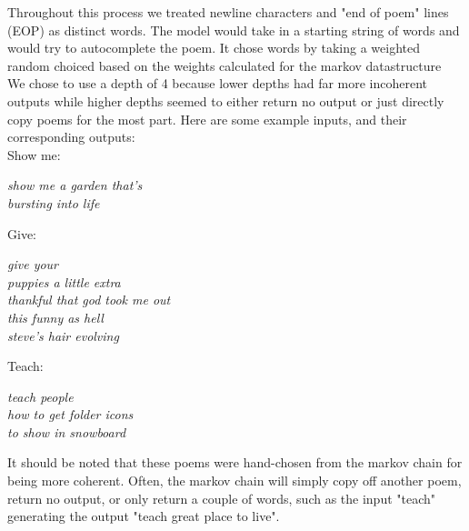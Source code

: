\documentclass{article} %
\begin{document}
Throughout this process we treated newline characters and "end of poem" lines (EOP) as distinct words. The model would take in a starting string of
words and would try to autocomplete the poem. It chose words by taking a weighted random choiced based on the weights calculated for the markov
datastructure\\

We chose to use a depth of 4 because lower depths had far more incoherent outputs while higher depths seemed to either return no output
or just directly copy poems for the most part. Here are some example inputs, and their corresponding outputs:\\


Show me:
\begin{flushleft}
  \textit{
      \hspace{2em} show me a garden that's \\
      \hspace{2em} bursting into life
  }
\end{flushleft}

Give:
\begin{flushleft}
  \textit{
      \hspace{2em} give your \\
      \hspace{2em} puppies a little extra\\
      \hspace{2em} thankful that god took me out\\
      \hspace{2em} this funny as hell\\
      \hspace{2em} steve's hair evolving\\
  }
\end{flushleft}


 Teach:
 \begin{flushleft}
  \textit{
      \hspace{2em} teach people  \\
      \hspace{2em} how to get folder icons\\
      \hspace{2em} to show in snowboard\\
  }
\end{flushleft}

It should be noted that these poems were hand-chosen from the markov chain for being more coherent. Often, the markov chain will simply copy
off another poem, return no output, or only return a couple of words, such as the input "teach" generating the output "teach great place to live".\\
\end{document}
